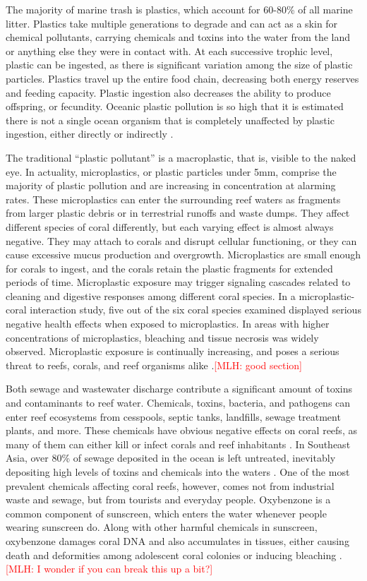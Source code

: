\documentclass{book}\usepackage{knitr}
\newcommand{\red}[1]{\textcolor{red}{[MLH: #1]}}
\begin{document}
{The majority of marine trash is plastics, which account for 60-80\% of all marine litter. Plastics take multiple generations to degrade and can act as a skin for chemical pollutants, carrying chemicals and toxins into the water from the land or anything else they were in contact with. At each successive trophic level, plastic can be ingested, as there is significant variation among the size of plastic particles. Plastics travel up the entire food chain, decreasing both energy reserves and feeding capacity. Plastic ingestion also decreases the ability to produce offspring, or fecundity. Oceanic plastic pollution is so high that it is estimated there is not a single ocean organism that is completely unaffected by plastic ingestion, either directly or indirectly \citep{12907334620180601}.

The traditional ``plastic pollutant'' is a macroplastic, that is, visible to the naked eye. In actuality, microplastics, or plastic particles under 5mm, comprise the majority of plastic pollution and are increasing in concentration at alarming rates. These microplastics can enter the surrounding reef waters as fragments from larger plastic debris or in terrestrial runoffs and waste dumps. They affect different species of coral differently, but each varying effect is almost always negative. They may attach to corals and disrupt cellular functioning, or they can cause excessive mucus production and overgrowth. Microplastics are small enough for corals to ingest, and the corals retain the plastic fragments for extended periods of time. Microplastic exposure may trigger signaling cascades related to cleaning and digestive responses among different coral species. In a microplastic-coral interaction study, five out of the six coral species examined displayed serious negative health effects when exposed to microplastics. In areas with higher concentrations of microplastics, bleaching and tissue necrosis was widely observed. Microplastic exposure is continually increasing, and poses a serious threat to reefs, corals, and reef organisms alike \citep{12907334620180601}.\red{good section}

Both sewage and wastewater discharge contribute a significant amount of toxins and contaminants to reef water. Chemicals, toxins, bacteria, and pathogens can enter reef ecosystems from cesspools, septic tanks, landfills, sewage treatment plants, and more. These chemicals have obvious negative effects on coral reefs, as many of them can either kill or infect corals and reef inhabitants \citep{coralreefalliance_2021}. In Southeast Asia, over 80\% of sewage deposited in the ocean is left untreated, inevitably depositing high levels of toxins and chemicals into the waters \citep{4884777420100401}. One of the most prevalent chemicals affecting coral reefs, however, comes not from industrial waste and sewage, but from tourists and everyday people. Oxybenzone is a common component of sunscreen, which enters the water whenever people wearing sunscreen do. Along with other harmful chemicals in sunscreen, oxybenzone damages coral DNA and also accumulates in tissues, either causing death and deformities among adolescent coral colonies or inducing bleaching \citep{USEPA_2017}.\red{I wonder if you can break this up a bit?}

}
\end{document}

